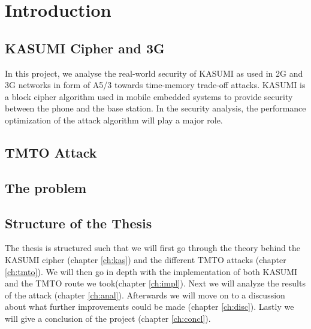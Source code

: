 \chapter{Introduction}

\section{KASUMI Cipher and 3G}

In this project, we analyse the real-world security of KASUMI as used
in 2G and 3G networks in form of A5/3 towards time-memory trade-off
attacks. KASUMI is a block cipher algorithm used in mobile embedded
systems to provide security between the phone and the base station. In
the security analysis, the performance optimization of the attack
algorithm will play a major role.

\section{TMTO Attack}



\section{The problem}

\section{Structure of the Thesis}

The thesis is structured such that we will first go through the theory
behind the KASUMI cipher (chapter \ref{ch:kas}) and the different TMTO
attacks (chapter \ref{ch:tmto}). We will then go in depth with the
implementation of both KASUMI and the TMTO route we took(chapter
\ref{ch:impl}). Next we will analyze the results of the attack
(chapter \ref{ch:anal}). Afterwards we will move on to a discussion
about what further improvements could be made (chapter
\ref{ch:disc}). Lastly we will give a conclusion of the project
(chapter \ref{ch:concl}).

